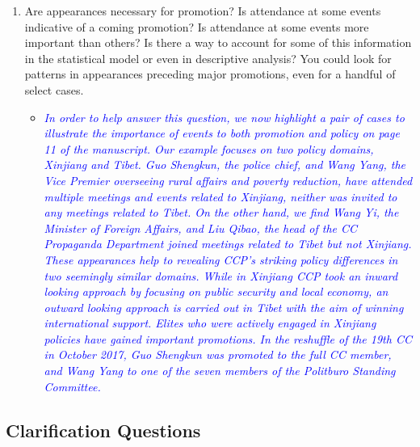 \begin{enumerate}
\begin{itemize}
{{		}}
	\end{itemize}
	\item Are appearances necessary for promotion? Is attendance at some events indicative of a coming promotion? Is attendance at some events more important than others? Is there a way to account for some of this information in the statistical model or even in descriptive analysis? You could look for patterns in appearances preceding major promotions, even for a handful of select cases.
	\begin{itemize}
		\item \textcolor{blue}{ \emph{
			In order to help answer this question, we now highlight  a pair of cases to illustrate the importance of events to both promotion and policy on page 11 of the manuscript. Our example focuses on two policy domains, Xinjiang and Tibet.  Guo Shengkun, the police chief, and Wang Yang, the Vice Premier overseeing rural affairs and poverty reduction, have attended multiple meetings and events related to Xinjiang, neither was invited to any meetings related to Tibet.   On the other hand, we find Wang Yi, the Minister of Foreign Affairs, and Liu Qibao, the head of the CC Propaganda Department joined meetings related to Tibet but not Xinjiang.  These appearances help to revealing CCP’s striking policy differences in two seemingly similar domains.  While in Xinjiang CCP took an inward looking approach by focusing on public security and local economy, an outward looking approach is carried out in Tibet with the aim of winning international support.  Elites who were actively engaged in Xinjiang policies have gained important promotions.  In the reshuffle of the 19th CC in October 2017, Guo Shengkun was promoted to the full CC member, and Wang Yang to one of the seven members of the Politburo Standing Committee.
		}}
	\end{itemize}
\end{enumerate}

\subsection*{Clarification Questions}

